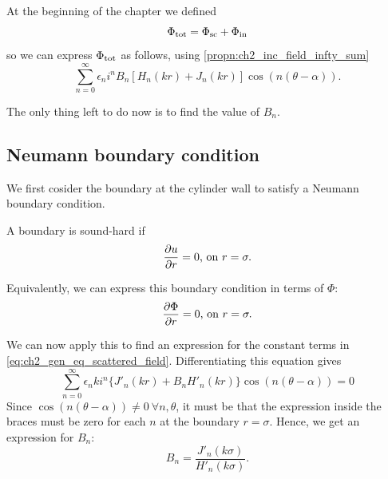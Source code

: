 At the beginning of the chapter we defined
  \[ \Phi_{\text{tot}} = \Phi_{\text{sc}} + \Phi_{\text{in}} \]
so we can express $\Phi_{\text{tot}}$ as follows, using \eqref{propn:ch2_inc_field_infty_sum}
\begin{equation}
  \sum^\infty_{n=0} \epsilon_n i^n B_n [H_n(kr) + J_n(kr)] \cos(n(\theta-\alpha)).
\end{equation}

The only thing left to do now is to find the value of $B_n$.

\subsection*{Neumann boundary condition}

We first cosider the boundary at the cylinder wall to satisfy a Neumann boundary condition.
  \begin{defn}
    \parencite[$\S$1.3.2]{martin06scattering} A boundary is sound-hard if
      \begin{align*}
        \frac{\partial u}{\partial r} = 0 \text{,  on } r = \sigma.
      \end{align*}
  \end{defn} \par
%
Equivalently, we can express this boundary condition in terms of $\Phi$:
  \begin{align*}
    \frac{\partial \Phi}{\partial r}=0 \text{,  on } r = \sigma.
  \end{align*} \par
%
We can now apply this to find an expression for the constant terms in \eqref{eq:ch2_gen_eq_scattered_field}. Differentiating this equation gives
  \begin{equation}
    \sum^\infty_{n=0} \epsilon_n k i^n
    \{ J'_n(kr) + B_n H'_n(kr) \} \cos(n(\theta-\alpha)) = 0
  \end{equation}
Since $\cos(n(\theta - \alpha)) \neq 0 ~ \forall n, \theta$, it must be that the expression inside the braces must be zero for each $n$ at the boundary $r=\sigma$. Hence, we get an expression for $B_n$:
  \begin{equation}
    B_n= \frac{J'_n(k\sigma)}{H'_n(k\sigma)}.
  \end{equation}

